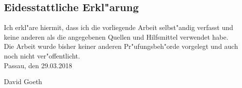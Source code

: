 \begin{center}

\begin{minipage}{.8\textwidth}

\chapter*{Eidesstattliche Erkl"arung}

Ich erkl"are hiermit, dass ich die vorliegende Arbeit selbst"andig verfasst und
keine anderen als die angegebenen Quellen und Hilfsmittel verwendet habe.\\

Die Arbeit wurde bisher keiner anderen Pr"ufungsbeh"orde vorgelegt und auch noch nicht ver"offentlicht.\\

Passau, den 29.03.2018

\vspace{1cm}

David Goeth

\end{minipage}

\end{center}

\clearpage